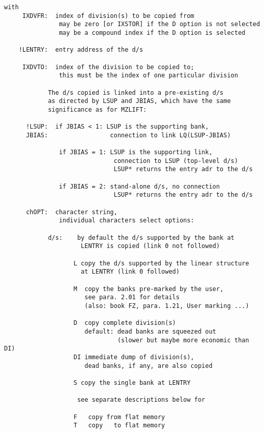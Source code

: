 \begin{verbatim}
with
     IXDVFR:  index of division(s) to be copied from
               may be zero [or IXSTOR] if the D option is not selected
               may be a compound index if the D option is selected

    !LENTRY:  entry address of the d/s

     IXDVTO:  index of the division to be copied to;
               this must be the index of one particular division

            The d/s copied is linked into a pre-existing d/s
            as directed by LSUP and JBIAS, which have the same
            significance as for MZLIFT:

      !LSUP:  if JBIAS < 1: LSUP is the supporting bank,
      JBIAS:                 connection to link LQ(LSUP-JBIAS)

               if JBIAS = 1: LSUP is the supporting link,
                              connection to LSUP (top-level d/s)
                              LSUP* returns the entry adr to the d/s

               if JBIAS = 2: stand-alone d/s, no connection
                              LSUP* returns the entry adr to the d/s

      chOPT:  character string,
               individual characters select options:

            d/s:    by default the d/s supported by the bank at
                     LENTRY is copied (link 0 not followed)

                   L copy the d/s supported by the linear structure
                     at LENTRY (link 0 followed)

                   M  copy the banks pre-marked by the user,
                      see para. 2.01 for details
                      (also: book FZ, para. 1.21, User marking ...)

                   D  copy complete division(s)
                      default: dead banks are squeezed out
                               (slower but maybe more economic than DI)
                   DI immediate dump of division(s),
                      dead banks, if any, are also copied

                   S copy the single bank at LENTRY

                    see separate descriptions below for

                   F   copy from flat memory
                   T   copy   to flat memory
\end{verbatim} 

